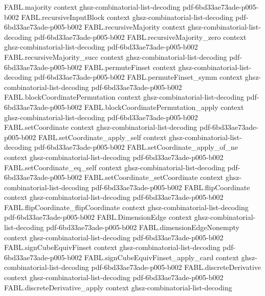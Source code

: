 \begin{theorem}
  {FABL.majority}
  {context}
  {ghsz-combinatorial-list-decoding}
  {pdf-6bd33ae73ade-p005-b002}
\proofstep
  {FABL.recursiveInputBlock}
  {context}
  {ghsz-combinatorial-list-decoding}
  {pdf-6bd33ae73ade-p005-b002}
\proofstep
  {FABL.recursiveMajority}
  {context}
  {ghsz-combinatorial-list-decoding}
  {pdf-6bd33ae73ade-p005-b002}
\proofstep
  {FABL.recursiveMajority_zero}
  {context}
  {ghsz-combinatorial-list-decoding}
  {pdf-6bd33ae73ade-p005-b002}
\proofstep
  {FABL.recursiveMajority_succ}
  {context}
  {ghsz-combinatorial-list-decoding}
  {pdf-6bd33ae73ade-p005-b002}
\proofstep
  {FABL.permuteFinset}
  {context}
  {ghsz-combinatorial-list-decoding}
  {pdf-6bd33ae73ade-p005-b002}
\proofstep
  {FABL.permuteFinset_symm}
  {context}
  {ghsz-combinatorial-list-decoding}
  {pdf-6bd33ae73ade-p005-b002}
\proofstep
  {FABL.blockCoordinatePermutation}
  {context}
  {ghsz-combinatorial-list-decoding}
  {pdf-6bd33ae73ade-p005-b002}
\proofstep
  {FABL.blockCoordinatePermutation_apply}
  {context}
  {ghsz-combinatorial-list-decoding}
  {pdf-6bd33ae73ade-p005-b002}
\proofstep
  {FABL.setCoordinate}
  {context}
  {ghsz-combinatorial-list-decoding}
  {pdf-6bd33ae73ade-p005-b002}
\proofstep
  {FABL.setCoordinate_apply_self}
  {context}
  {ghsz-combinatorial-list-decoding}
  {pdf-6bd33ae73ade-p005-b002}
\proofstep
  {FABL.setCoordinate_apply_of_ne}
  {context}
  {ghsz-combinatorial-list-decoding}
  {pdf-6bd33ae73ade-p005-b002}
\proofstep
  {FABL.setCoordinate_eq_self}
  {context}
  {ghsz-combinatorial-list-decoding}
  {pdf-6bd33ae73ade-p005-b002}
\proofstep
  {FABL.setCoordinate_setCoordinate}
  {context}
  {ghsz-combinatorial-list-decoding}
  {pdf-6bd33ae73ade-p005-b002}
\proofstep
  {FABL.flipCoordinate}
  {context}
  {ghsz-combinatorial-list-decoding}
  {pdf-6bd33ae73ade-p005-b002}
\proofstep
  {FABL.flipCoordinate_flipCoordinate}
  {context}
  {ghsz-combinatorial-list-decoding}
  {pdf-6bd33ae73ade-p005-b002}
\proofstep
  {FABL.DimensionEdge}
  {context}
  {ghsz-combinatorial-list-decoding}
  {pdf-6bd33ae73ade-p005-b002}
\proofstep
  {FABL.dimensionEdgeNonempty}
  {context}
  {ghsz-combinatorial-list-decoding}
  {pdf-6bd33ae73ade-p005-b002}
\proofstep
  {FABL.signCubeEquivFinset}
  {context}
  {ghsz-combinatorial-list-decoding}
  {pdf-6bd33ae73ade-p005-b002}
\proofstep
  {FABL.signCubeEquivFinset_apply_card}
  {context}
  {ghsz-combinatorial-list-decoding}
  {pdf-6bd33ae73ade-p005-b002}
\proofstep
  {FABL.discreteDerivative}
  {context}
  {ghsz-combinatorial-list-decoding}
  {pdf-6bd33ae73ade-p005-b002}
\proofstep
  {FABL.discreteDerivative_apply}
  {context}
  {ghsz-combinatorial-list-decoding}

\end{theorem}
